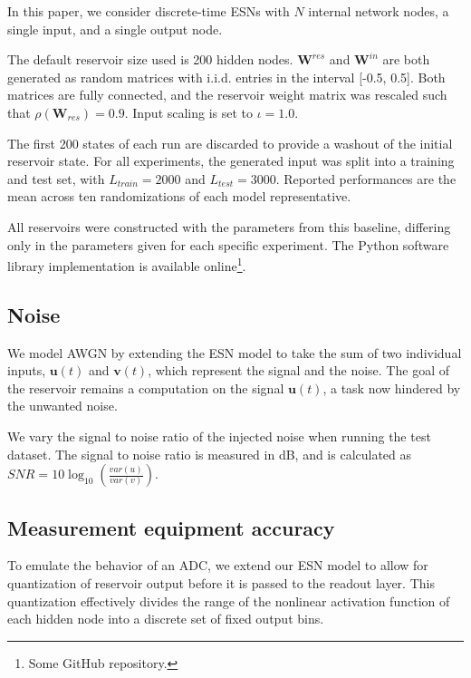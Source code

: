 In this paper, we consider discrete-time ESNs with $N$ internal network nodes, a
single input, and a single output node.

The default reservoir size used is 200 hidden nodes. $\mathbf{W}^{res}$ and
$\mathbf{W}^{in}$ are both generated as random matrices with i.i.d. entries in
the interval [-0.5, 0.5]. Both matrices are fully connected, and the reservoir
weight matrix was rescaled such that $\rho(\mathbf{W}_{res}) = 0.9$.  Input
scaling is set to $\iota = 1.0$.

The first 200 states of each run are discarded to provide a washout of the
initial reservoir state. For all experiments, the generated input was split into
a training and test set, with $L_{train} = 2000$ and $L_{test} = 3000$. Reported
performances are the mean across ten randomizations of each model
representative.

All reservoirs were constructed with the parameters from this baseline,
differing only in the parameters given for each specific experiment. The Python
software library implementation is available online\footnote{Some GitHub
repository.}.


\subsection{Noise}

We model AWGN by extending the ESN model to take the sum of two individual
inputs, $\mathbf{u}(t)$ and $\mathbf{v}(t)$, which represent the signal and the
noise. The goal of the reservoir remains a computation on the signal
$\mathbf{u}(t)$, a task now hindered by the unwanted noise.

We vary the signal to noise ratio of the injected noise when running the test
dataset. The signal to noise ratio is measured in dB, and is calculated as $SNR
= 10\log_{10}(\frac{var(u)}{var(v)})$.

\subsection{Measurement equipment accuracy}

To emulate the behavior of an ADC, we extend our ESN model to allow for
quantization of reservoir output before it is passed to the readout layer. This
quantization effectively divides the range of the nonlinear activation function
of each hidden node into a discrete set of fixed output bins.

